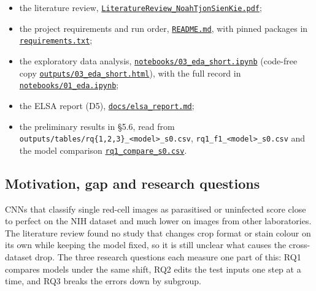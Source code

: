 \documentclass[11pt,a4paper]{article}
\begin{document}
\begin{itemize}
\item the literature review, \href{https://gitlab.uvt.nl/capstone/2026-fall/u927271/-/blob/v1.0-final/LiteratureReview_NoahTjonSienKie.pdf}{\texttt{LiteratureReview\_\allowbreak{}NoahTjonSienKie.\allowbreak{}pdf}};
\item the project requirements and run order, \href{https://gitlab.uvt.nl/capstone/2026-fall/u927271/-/blob/v1.0-final/README.md}{\texttt{README.\allowbreak{}md}}, with pinned packages in \href{https://gitlab.uvt.nl/capstone/2026-fall/u927271/-/blob/v1.0-final/requirements.txt}{\texttt{requirements.\allowbreak{}txt}};
\item the exploratory data analysis, \href{https://gitlab.uvt.nl/capstone/2026-fall/u927271/-/blob/v1.0-final/notebooks/03_eda_short.ipynb}{\texttt{notebooks/\allowbreak{}03\_\allowbreak{}eda\_\allowbreak{}short.\allowbreak{}ipynb}} (code-free copy \href{https://gitlab.uvt.nl/capstone/2026-fall/u927271/-/blob/v1.0-final/outputs/03_eda_short.html}{\texttt{outputs/\allowbreak{}03\_\allowbreak{}eda\_\allowbreak{}short.\allowbreak{}html}}), with the full record in \href{https://gitlab.uvt.nl/capstone/2026-fall/u927271/-/blob/v1.0-final/notebooks/01_eda.ipynb}{\texttt{notebooks/\allowbreak{}01\_\allowbreak{}eda.\allowbreak{}ipynb}};
\item the ELSA report (D5), \href{https://gitlab.uvt.nl/capstone/2026-fall/u927271/-/blob/v1.0-final/docs/elsa_report.md}{\texttt{docs/\allowbreak{}elsa\_\allowbreak{}report.\allowbreak{}md}};
\item the preliminary results in \S{}5.6, read from \texttt{outputs/\allowbreak{}tables/\allowbreak{}rq\{1,2,3\}\_\allowbreak{}<model>\_\allowbreak{}s0.\allowbreak{}csv}, \texttt{rq1\_\allowbreak{}f1\_\allowbreak{}<model>\_\allowbreak{}s0.\allowbreak{}csv} and the model comparison \href{https://gitlab.uvt.nl/capstone/2026-fall/u927271/-/blob/v1.0-final/outputs/tables/rq1_compare_s0.csv}{\texttt{rq1\_\allowbreak{}compare\_\allowbreak{}s0.\allowbreak{}csv}}.
\end{itemize}

\subsection{Motivation, gap and research questions}

CNNs that classify single red-cell images as parasitised or uninfected score close to perfect on the NIH dataset and much lower on images from other laboratories. The literature review found no study that changes crop format or stain colour on its own while keeping the model fixed, so it is still unclear what causes the cross-dataset drop. The three research questions each measure one part of this: RQ1 compares models under the same shift, RQ2 edits the test inputs one step at a time, and RQ3 breaks the errors down by subgroup.
\end{document}

